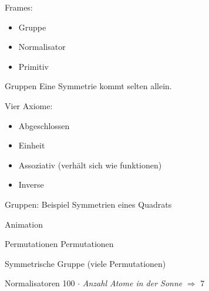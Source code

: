 \begin{frame}
Frames:
\begin{itemize}
\item Gruppe
\item Normalisator
\item Primitiv
\end{itemize}
\end{frame}

\begin{frame}{Gruppen}
Eine Symmetrie kommt selten allein.

Vier Axiome:
\begin{itemize}
\item Abgeschlossen
\item Einheit
\item Assoziativ (verhält sich wie funktionen)
\item Inverse
\end{itemize}
\end{frame}

\begin{frame}{Gruppen: Beispiel}
Symmetrien eines Quadrats

Animation
\end{frame}

\begin{frame}{Permutationen}
Permutationen

Symmetrische Gruppe (viele Permutationen)
\end{frame}

\begin{frame}{Normalisatoren}
100 $\cdot$ \emph{Anzahl Atome in der Sonne} $\Rightarrow$ 7
\end{frame}
